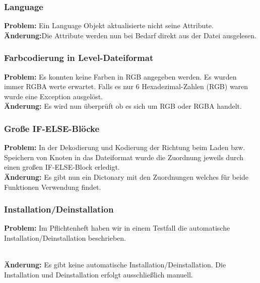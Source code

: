 \subsubsection*{Language}
\textbf{Problem:}
Ein Language Objekt aktualisierte nicht seine Attribute.
~\\
\textbf{Änderung:}Die Attribute werden nun bei Bedarf direkt aus der Datei ausgelesen.

\subsubsection*{Farbcodierung in Level-Dateiformat}
\textbf{Problem:}
Es konnten keine Farben in RGB angegeben werden. Es wurden immer RGBA werte erwartet.
Falls es nur 6 Hexadezimal-Zahlen (RGB) waren wurde eine Exception ausgelöst.
~\\
\textbf{Änderung:} Es wird nun überprüft ob es sich um RGB oder RGBA handelt.

\subsubsection*{Große IF-ELSE-Blöcke}
\textbf{Problem:}
In der Dekodierung und Kodierung der Richtung beim Laden bzw. Speichern von Knoten in das Dateiformat wurde die Zuordnung jeweils durch einen großen IF-ELSE-Block erledigt.
~\\
\textbf{Änderung:} Es gibt nun ein Dictonary mit den Zuordnungen welches für beide Funktionen Verwendung findet.


\subsubsection*{Installation/Deinstallation}
\textbf{Problem:} Im Pflichtenheft haben wir in einem Testfall die automatische Installation/Deinstallation beschrieben.

~\\
\textbf{Änderung:} Es gibt keine automatische Installation/Deinstallation. Die Installation und Deinstallation erfolgt ausschließlich manuell.






